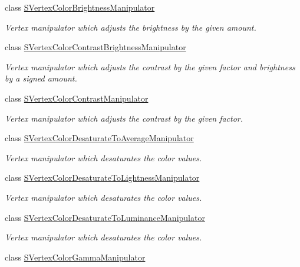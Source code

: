 \begin{DoxyCompactItemize}
class \hyperlink{classirr_1_1scene_1_1SVertexColorBrightnessManipulator}{S\+Vertex\+Color\+Brightness\+Manipulator}
\begin{DoxyCompactList}\small\item\em Vertex manipulator which adjusts the brightness by the given amount. \end{DoxyCompactList}\item 
class \hyperlink{classirr_1_1scene_1_1SVertexColorContrastBrightnessManipulator}{S\+Vertex\+Color\+Contrast\+Brightness\+Manipulator}
\begin{DoxyCompactList}\small\item\em Vertex manipulator which adjusts the contrast by the given factor and brightness by a signed amount. \end{DoxyCompactList}\item 
class \hyperlink{classirr_1_1scene_1_1SVertexColorContrastManipulator}{S\+Vertex\+Color\+Contrast\+Manipulator}
\begin{DoxyCompactList}\small\item\em Vertex manipulator which adjusts the contrast by the given factor. \end{DoxyCompactList}\item 
class \hyperlink{classirr_1_1scene_1_1SVertexColorDesaturateToAverageManipulator}{S\+Vertex\+Color\+Desaturate\+To\+Average\+Manipulator}
\begin{DoxyCompactList}\small\item\em Vertex manipulator which desaturates the color values. \end{DoxyCompactList}\item 
class \hyperlink{classirr_1_1scene_1_1SVertexColorDesaturateToLightnessManipulator}{S\+Vertex\+Color\+Desaturate\+To\+Lightness\+Manipulator}
\begin{DoxyCompactList}\small\item\em Vertex manipulator which desaturates the color values. \end{DoxyCompactList}\item 
class \hyperlink{classirr_1_1scene_1_1SVertexColorDesaturateToLuminanceManipulator}{S\+Vertex\+Color\+Desaturate\+To\+Luminance\+Manipulator}
\begin{DoxyCompactList}\small\item\em Vertex manipulator which desaturates the color values. \end{DoxyCompactList}\item 
class \hyperlink{classirr_1_1scene_1_1SVertexColorGammaManipulator}{S\+Vertex\+Color\+Gamma\+Manipulator}

\end{DoxyCompactItemize}
